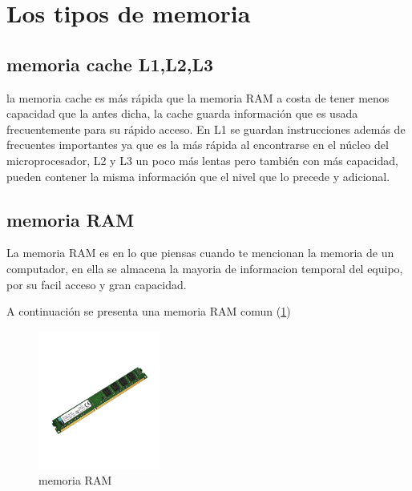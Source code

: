 \documentclass{article}
\begin{document}
 \vspace{0.4cm}

\section{Los tipos de memoria} 

\vspace{0.3cm}

\subsection{memoria cache L1,L2,L3}

la memoria cache es más rápida que la memoria RAM a costa de tener menos capacidad que la antes dicha, la cache guarda información que es usada frecuentemente para su rápido acceso. En L1 se guardan instrucciones además de frecuentes importantes ya que es la más rápida al encontrarse en el núcleo del microprocesador, L2 y L3 un poco más lentas pero también con más capacidad, pueden contener la misma información que el nivel que lo precede y adicional.

\vspace{0.3cm}

\subsection{memoria RAM}

La memoria RAM es en lo que piensas cuando te mencionan la memoria de un computador, en ella se almacena la mayoria de informacion temporal del equipo, por su facil acceso y gran capacidad.

\vspace{0.6cm}

A continuación se presenta una memoria RAM comun (\ref{fig:RAM})

\begin{figure}[h]
\includegraphics[width=4cm]{RAM.jpg}
\centering
\caption{memoria RAM}
\label{fig:RAM}
\end{figure}
\end{document}
